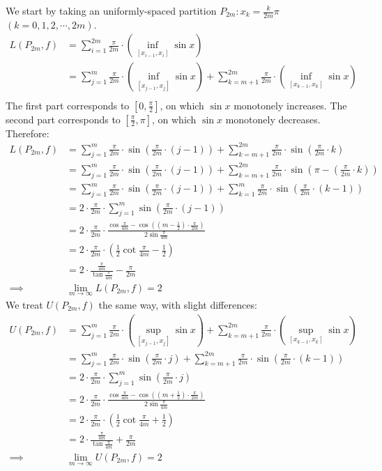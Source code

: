 \documentclass{article}
\def\to{\rightarrow}
\begin{document}
We start by taking an uniformly-spaced partition $P_{2m}: x_k = \frac{k}{2m} \pi$ $(k=0,1,2,\cdots,2m)$.
$$\begin{aligned}
L(P_{2m}, f) &= \sum_{i=1}^{2m} \frac{\pi}{2m} \cdot \left( \inf_{[x_{i-1}, x_i]} \sin x \right) \\
&= \sum_{j=1}^m \frac{\pi}{2m} \cdot \left( \inf_{[x_{j-1}, x_j]} \sin x \right) + \sum_{k={m+1}}^{2m} \frac{\pi}{2m} \cdot \left( \inf_{[x_{k-1}, x_k]} \sin x \right) \\
\end{aligned}$$
The first part corresponds to $[0,\frac{\pi}{2}]$, on which $\sin x$ monotonely increases. The second part corresponds to $[\frac{\pi}{2},\pi]$, on which $\sin x$ monotonely decreases. Therefore:
$$\begin{aligned}
L(P_{2m}, f) &= \sum_{j=1}^m \frac{\pi}{2m} \cdot \sin \left(\frac{\pi}{2m} \cdot (j-1)\right) + \sum_{k={m+1}}^{2m} \frac{\pi}{2m} \cdot \sin \left(\frac{\pi}{2m} \cdot k\right) \\
&= \sum_{j=1}^m \frac{\pi}{2m} \cdot \sin \left(\frac{\pi}{2m} \cdot (j-1)\right) + \sum_{k={m+1}}^{2m} \frac{\pi}{2m} \cdot \sin \left(\pi - \left(\frac{\pi}{2m} \cdot k\right)\right) \\
&= \sum_{j=1}^m \frac{\pi}{2m} \cdot \sin \left(\frac{\pi}{2m} \cdot (j-1)\right) + \sum_{k=1}^{m} \frac{\pi}{2m} \cdot \sin \left(\frac{\pi}{2m} \cdot (k-1)\right) \\
&= 2 \cdot \frac{\pi}{2m} \cdot \sum_{j=1}^m \sin \left(\frac{\pi}{2m} \cdot (j-1)\right) \\
&= 2 \cdot \frac{\pi}{2m} \cdot \frac{ \cos\frac{\pi}{4m} - \cos\left( (m-\frac{1}{2}) \cdot \frac{\pi}{2m} \right) }{2\sin\frac{\pi}{4m}} \\
&= 2 \cdot \frac{\pi}{2m} \cdot \left( \frac{1}{2}\cot\frac{\pi}{4m} - \frac{1}{2} \right) \\
&= 2 \cdot \frac{ \frac{\pi}{4m} }{ \tan\frac{\pi}{4m} } - \frac{\pi}{2m} \\
\implies &\lim_{m\to\infty} L(P_{2m}, f) = 2
\end{aligned}$$
We treat $U(P_{2m}, f)$ the same way, with slight differences:
$$\begin{aligned}
U(P_{2m}, f) &= \sum_{j=1}^m \frac{\pi}{2m} \cdot \left( \sup_{[x_{j-1}, x_j]} \sin x \right) + \sum_{k={m+1}}^{2m} \frac{\pi}{2m} \cdot \left( \sup_{[x_{k-1}, x_k]} \sin x \right) \\
&= \sum_{j=1}^m \frac{\pi}{2m} \cdot \sin \left(\frac{\pi}{2m} \cdot j\right) + \sum_{k={m+1}}^{2m} \frac{\pi}{2m} \cdot \sin \left(\frac{\pi}{2m} \cdot (k-1)\right) \\
&= 2 \cdot \frac{\pi}{2m} \cdot \sum_{j=1}^m \sin \left(\frac{\pi}{2m} \cdot j\right) \\
&= 2 \cdot \frac{\pi}{2m} \cdot \frac{ \cos\frac{\pi}{4m} - \cos\left( (m+\frac{1}{2}) \cdot \frac{\pi}{2m} \right) }{2\sin\frac{\pi}{4m}} \\
&= 2 \cdot \frac{\pi}{2m} \cdot \left( \frac{1}{2}\cot\frac{\pi}{4m} + \frac{1}{2} \right) \\
&= 2 \cdot \frac{ \frac{\pi}{4m} }{ \tan\frac{\pi}{4m} } + \frac{\pi}{2m} \\
\implies &\lim_{m\to\infty} U(P_{2m}, f) = 2
\end{aligned}$$
\end{document}
